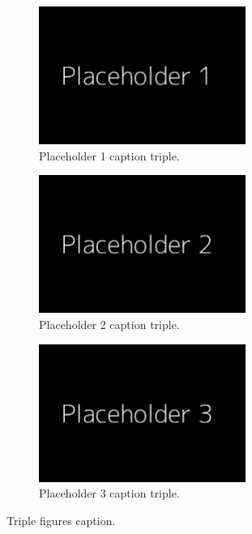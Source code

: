 \documentclass[11pt]{article}
\begin{document}
\begin{enumerate}[wide, labelindent=0pt]
\begin{enumerate}[wide, labelindent=0pt]
        \begin{figure}[h]
            \begin{subfigure}[b]{0.3\textwidth}
            \includegraphics[height=4.5cm]{images/Placeholder1.png}
                \caption{Placeholder 1 caption triple.}
            \label{fig:placeholder_1_triple}
            \end{subfigure}
            \hspace{0.01\textwidth}
            \begin{subfigure}[b]{0.3\textwidth}
                \includegraphics[height=4.5cm]{images/Placeholder2.png}
                \caption{Placeholder 2 caption triple.}
                \label{fig:placeholder_2_triple}
            \end{subfigure}
            \hspace{0.01\textwidth}
            \begin{subfigure}[b]{0.3\textwidth}
                \includegraphics[height=4.5cm]{images/Placeholder3.png}
                \caption{Placeholder 3 caption triple.}
                \label{fig:placeholder_3_triple}
            \end{subfigure}
            \caption{Triple figures caption.}
            \label{fig:3_figures_row}
        \end{figure}
        

    \end{enumerate}
\end{enumerate}
\end{document}
